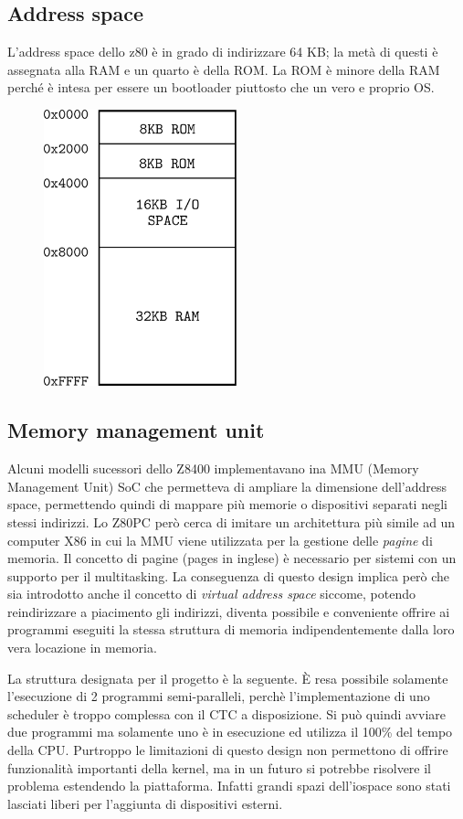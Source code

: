 \documentclass[a4paper, 11pt]{article}
\newcommand{\prj}{Z80\textmu PC\xspace}
\begin{document}
\subsection{Address space}
L'address space dello z80 \`e in grado di indirizzare 64 KB; la met\`a di
questi \`e assegnata alla RAM e un quarto \`e della ROM. La ROM \`e minore
della RAM perch\'e \`e intesa per essere un bootloader piuttosto che un vero e
proprio OS.
\begin{figure}[H]
\centering
\includegraphics[height=8cm]{res/addrspace}
\end{figure}

\subsection{Memory management unit}
Alcuni modelli sucessori dello Z8400 implementavano ina MMU (Memory Management
Unit) SoC che permetteva di ampliare la dimensione dell'address space,
permettendo quindi di mappare pi\`u memorie o dispositivi separati negli stessi
indirizzi. Lo \prj per\`o cerca di imitare un architettura pi\`u simile ad un
computer X86 in cui la MMU viene utilizzata per la gestione delle \emph{pagine}
di memoria. Il concetto di pagine (pages in inglese) \`e necessario per sistemi
con un supporto per il multitasking. La conseguenza di questo design implica
per\`o che sia introdotto anche il concetto di \emph{virtual address space}
siccome, potendo reindirizzare a piacimento gli indirizzi, diventa possibile e
conveniente offrire ai programmi eseguiti la stessa struttura di memoria
indipendentemente dalla loro vera locazione in memoria.

La struttura designata per il progetto \`e la seguente. \`E resa possibile
solamente l'esecuzione di 2 programmi semi-paralleli, perch\`e
l'implementazione di uno scheduler \`e troppo complessa con il CTC a
disposizione. Si pu\`o quindi avviare due programmi ma solamente uno \`e in
esecuzione ed utilizza il 100\% del tempo della CPU. Purtroppo le limitazioni
di questo design non permettono di offrire funzionalit\`a importanti della
kernel, ma in un futuro  si potrebbe risolvere il problema estendendo la
piattaforma. Infatti grandi spazi dell'iospace sono stati lasciati liberi per
l'aggiunta di dispositivi esterni.
\end{document}
